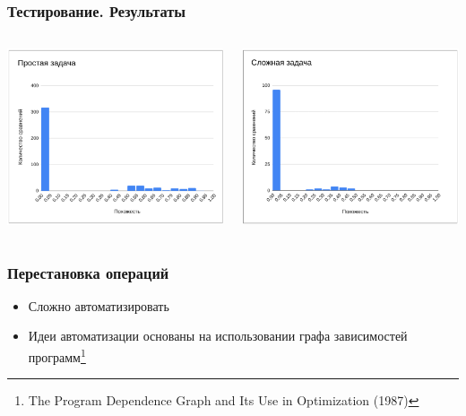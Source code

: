 \documentclass[10pt]{beamer}
\begin{document}
\begin{frame}\frametitle{Тестирование. Результаты}
	\begin{columns}
		\centering
		\includegraphics[scale=0.51]{res5.png}
		
		\centering
		\includegraphics[scale=0.51]{res6.png}
		
	\end{columns}
\end{frame}

\begin{frame}\frametitle{Перестановка операций}
	\begin{itemize}
		\item Сложно автоматизировать
		\item Идеи автоматизации основаны на использовании графа зависимостей программ\footnote[10,frame]{The Program Dependence Graph and Its Use in Optimization (1987)}
	\end{itemize}
\end{frame}
\end{document}
